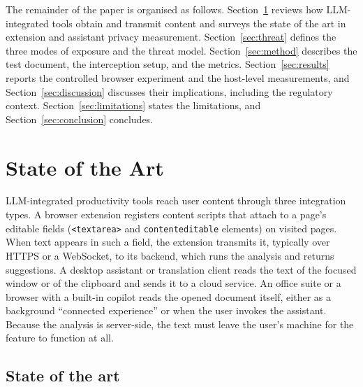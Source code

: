 \documentclass[sigconf,anonymous,review,balance=false]{acmart}
\begin{document}
The remainder of the paper is organised as follows. Section~\ref{sec:related} reviews how
LLM-integrated tools obtain and transmit content and surveys the state of the art in
extension and assistant privacy measurement. Section~\ref{sec:threat} defines the three
modes of exposure and the threat model. Section~\ref{sec:method} describes the test
document, the interception setup, and the metrics. Section~\ref{sec:results} reports the
controlled browser experiment and the host-level measurements, and
Section~\ref{sec:discussion} discusses their implications, including the regulatory
context. Section~\ref{sec:limitations} states the limitations, and
Section~\ref{sec:conclusion} concludes.

\section{State of the Art}
\label{sec:related}

LLM-integrated productivity tools reach user content through three integration types. A
browser extension registers content scripts that attach to a page's editable
fields (\texttt{<textarea>} and \texttt{contenteditable} elements) on visited pages. When
text appears in such a field, the extension transmits it, typically over HTTPS or a
WebSocket, to its backend, which runs the analysis and returns suggestions. A desktop
assistant or translation client reads the text of the focused window or of the clipboard
and sends it to a cloud service. An office suite or a browser with a built-in copilot reads
the opened document itself, either as a background ``connected experience'' or when the
user invokes the assistant. Because the analysis is server-side, the text must leave the user's machine for
the feature to function at all.

\subsection{State of the art}
\end{document}
